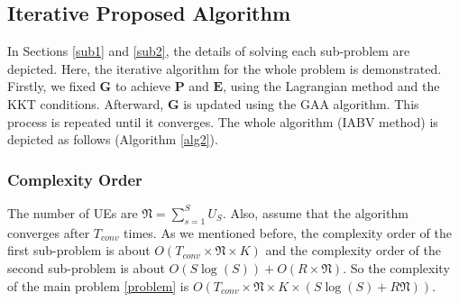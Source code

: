 \documentclass[lettersize,journal]{IEEEtran}
\begin{document}
\subsection{Iterative Proposed Algorithm}
In Sections \eqref{sub1} and \eqref{sub2}, the details of solving each sub-problem are depicted.
Here, the iterative algorithm for the whole problem is demonstrated.
Firstly, we fixed $\boldsymbol{G}$ to achieve $\boldsymbol{P}$ and $\boldsymbol{E}$, using the Lagrangian method and the KKT conditions.
Afterward, $\boldsymbol{G}$ is updated using the GAA algorithm. This process is repeated until it converges.
The whole algorithm (IABV method) is depicted as follows (Algorithm \ref{alg2}).

\subsubsection{Complexity Order}
The number of UEs are $\mathfrak{N} = \sum_{s=1}^{S}U_S$.
Also, assume that the algorithm converges after $T_{conv}$ times.
As we mentioned before, the complexity order of the first sub-problem is about $O(T_{conv} \times \mathfrak{N} \times K)$
and the complexity order of the second sub-problem is about $O(S\log(S)) + O(R\times \mathfrak{N})$.
So the complexity of the main problem \eqref{problem} is $O(T_{conv} \times \mathfrak{N} \times K \times (S\log(S)+R\mathfrak{N}))$.
\end{document}
